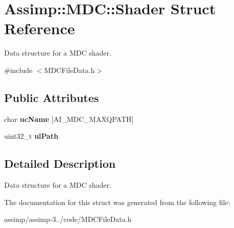\hypertarget{struct_assimp_1_1_m_d_c_1_1_shader}{\section{Assimp\+:\+:M\+D\+C\+:\+:Shader Struct Reference}
\label{struct_assimp_1_1_m_d_c_1_1_shader}
}


Data structure for a M\+D\+C shader.  




{\ttfamily \#include $<$M\+D\+C\+File\+Data.\+h$>$}

\subsection*{Public Attributes}
\begin{DoxyCompactItemize}
\item 
\hypertarget{struct_assimp_1_1_m_d_c_1_1_shader_ac7a0420eb3ab58f11dd0f0ddb736c351}{char {\bfseries uc\+Name} \mbox{[}A\+I\+\_\+\+M\+D\+C\+\_\+\+M\+A\+X\+Q\+P\+A\+T\+H\mbox{]}}\label{struct_assimp_1_1_m_d_c_1_1_shader_ac7a0420eb3ab58f11dd0f0ddb736c351}

\item 
\hypertarget{struct_assimp_1_1_m_d_c_1_1_shader_a9daf36c70c900774af24b86b9a00256a}{uint32\+\_\+t {\bfseries ul\+Path}}\label{struct_assimp_1_1_m_d_c_1_1_shader_a9daf36c70c900774af24b86b9a00256a}

\end{DoxyCompactItemize}


\subsection{Detailed Description}
Data structure for a M\+D\+C shader. 

The documentation for this struct was generated from the following file\+:\begin{DoxyCompactItemize}
\item 
assimp/assimp-\/3../code/M\+D\+C\+File\+Data.\+h\end{DoxyCompactItemize}

